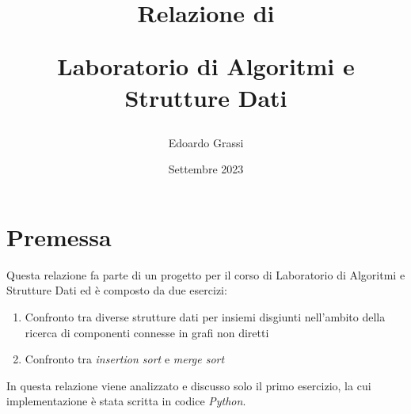 \documentclass[titlepage]{article}
\title{{\small\centerline {Relazione di}} Laboratorio di Algoritmi e Strutture Dati}
\author{Edoardo Grassi}
\date{Settembre 2023}
\begin{document}
\maketitle

\tableofcontents

\section*{Premessa}
Questa relazione fa parte di un progetto per il corso di Laboratorio
di Algoritmi e Strutture Dati ed è composto da due esercizi:
\begin{enumerate}
    \item Confronto tra diverse strutture dati per insiemi disgiunti nell'ambito della ricerca di componenti connesse in grafi non diretti
    \item Confronto tra \textit{insertion sort} e \textit{merge sort}
\end{enumerate}

In questa relazione viene analizzato e discusso solo il primo esercizio, 
la cui implementazione è stata scritta in codice \textit{Python}.




\end{document}
